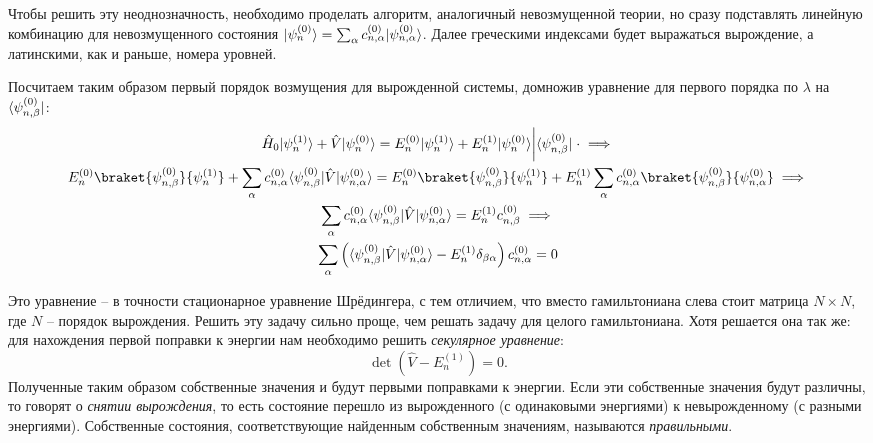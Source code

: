 Чтобы решить эту неоднозначность, необходимо проделать алгоритм, аналогичный
невозмущенной теории, но сразу подставлять линейную комбинацию для
невозмущенного состояния $\lvert\psi^{(0)}_n\rangle = \sum_{\alpha}c^{(0)}_{n,
      \alpha}\lvert\psi^{(0)}_{n,\alpha}\rangle$. Далее греческими индексами будет
выражаться вырождение, а латинскими, как и раньше, номера уровней.

Посчитаем таким образом первый порядок возмущения для вырожденной системы,
домножив уравнение для первого порядка по $\lambda$ на $\langle\psi^{(0)}_{n,
      \beta}\rvert$:
\begin{gather*}
  \hat{H}_0\ket{\psi^{(1)}_{n}} + \hat{V}\ket{\psi^{(0)}_{n}} = E^{(0)}_n\ket{\psi^{(1)}_{n}} + E^{(1)}_n\ket{\psi^{(0)}_{n}} \bigg{|} \bra{\psi^{(0)}_{n, \beta}}\; \cdot \implies \\
  E^{(0)}_n\braket{\psi^{(0)}_{n, \beta}}{\psi^{(1)}_{n}} + \sum\limits_{\alpha}c^{(0)}_{n, \alpha} \bra{\psi^{(0)}_{n, \beta}} \hat{V} \ket{\psi^{(0)}_{n, \alpha}} = E^{(0)}_n\braket{\psi^{(0)}_{n, \beta}}{\psi^{(1)}_{n}} + E^{(1)}_n\sum\limits_{\alpha}c^{(0)}_{n, \alpha}\braket{\psi^{(0)}_{n, \beta}}{\psi^{(0)}_{n, \alpha}} \implies \\
  \sum\limits_{\alpha}c^{(0)}_{n, \alpha} \bra{\psi^{(0)}_{n, \beta}} \hat{V} \ket{\psi^{(0)}_{n, \alpha}} = E^{(1)}_nc^{(0)}_{n, \beta} \implies \\
  \sum\limits_{\alpha}\left(\bra{\psi^{(0)}_{n, \beta}} \hat{V} \ket{\psi^{(0)}_{n, \alpha}} - E^{(1)}_n \delta_{\beta\alpha}\right)c^{(0)}_{n, \alpha} = 0
\end{gather*}

Это уравнение – в точности стационарное уравнение Шрёдингера, с тем отличием,
что вместо гамильтониана слева стоит матрица $N \times N$, где $N$ – порядок
вырождения. Решить эту задачу сильно проще, чем решать задачу для целого
гамильтониана. Хотя решается она так же: для нахождения первой поправки к
энергии нам необходимо решить \textit{секулярное уравнение}:
\[
  \det(\hat{V} - E^{(1)}_n) = 0.
\]
Полученные таким образом собственные значения и будут первыми поправками к
энергии. Если эти собственные значения будут различны, то говорят о
\textit{снятии вырождения}, то есть состояние перешло из вырожденного (с
одинаковыми энергиями) к невырожденному (с разными энергиями). Собственные
состояния, соответствующие найденным собственным значениям, называются
\textit{правильными}.

